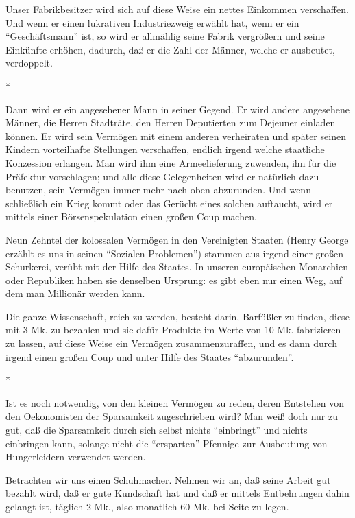 \documentclass{scrbook}
\begin{document}
Unser Fabrikbesitzer wird sich auf diese Weise ein nettes Einkommen verschaffen. Und wenn er einen lukrativen Industriezweig erwählt hat, wenn er ein ``Geschäftsmann'' ist, so wird er allmählig seine Fabrik vergrößern und seine Einkünfte erhöhen, dadurch, daß er die Zahl der Männer, welche er ausbeutet, verdoppelt.

\begin{center}*\end{center}

Dann wird er ein angesehener Mann in seiner Gegend. Er wird andere angesehene Männer, die Herren Stadträte, den Herren Deputierten zum Dejeuner einladen können. Er wird sein Vermögen mit einem anderen verheiraten und später seinen Kindern vorteilhafte Stellungen verschaffen, endlich irgend welche staatliche Konzession erlangen. Man wird ihm eine Armeelieferung zuwenden, ihn für die Präfektur vorschlagen; und alle diese Gelegenheiten wird er natürlich dazu benutzen, sein Vermögen immer mehr nach oben abzurunden. Und wenn schließlich ein Krieg kommt oder das Gerücht eines solchen auftaucht, wird er mittels einer Börsenspekulation einen großen Coup machen.

Neun Zehntel der kolossalen Vermögen in den Vereinigten Staaten (Henry George erzählt es uns in seinen ``Sozialen Problemen'') stammen aus irgend einer großen Schurkerei, verübt mit der Hilfe des Staates. In unseren europäischen Monarchien oder Republiken haben sie denselben Ursprung: es gibt eben nur einen Weg, auf dem man Millionär werden kann.

Die ganze Wissenschaft, reich zu werden, besteht darin, Barfüßler zu finden, diese mit 3 Mk. zu bezahlen und sie dafür Produkte im Werte von 10 Mk. fabrizieren zu lassen, auf diese Weise ein Vermögen zusammenzuraffen, und es dann durch irgend einen großen Coup und unter Hilfe des Staates ``abzurunden''.

\begin{center}*\end{center}

Ist es noch notwendig, von den kleinen Vermögen zu reden, deren Entstehen von den Oekonomisten der Sparsamkeit zugeschrieben wird? Man weiß doch nur zu gut, daß die Sparsamkeit durch sich selbst nichts ``einbringt'' und nichts einbringen kann, solange nicht die ``ersparten'' Pfennige zur Ausbeutung von Hungerleidern verwendet werden.

Betrachten wir uns einen Schuhmacher. Nehmen wir an, daß seine Arbeit gut bezahlt wird, daß er gute Kundschaft hat und daß er mittels Entbehrungen dahin gelangt ist, täglich 2 Mk., also monatlich 60 Mk. bei Seite zu legen.
\end{document}
